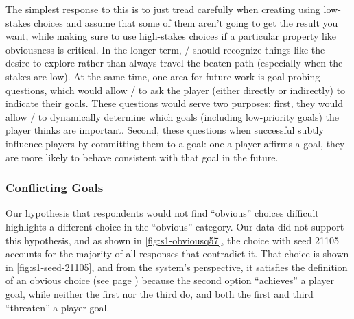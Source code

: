 The simplest response to this is to just tread carefully when creating using low-stakes choices and assume that some of them aren't going to get the result you want, while making sure to use high-stakes choices if a particular property like obviousness is critical.
%
In the longer term, \dunyazad/ should recognize things like the desire to explore rather than always travel the beaten path (especially when the stakes are low).
%
At the same time, one area for future work is goal-probing questions, which would allow \dunyazad/ to ask the player (either directly or indirectly) to indicate their goals.
%
These questions would serve two purposes: first, they would allow \dunyazad/ to dynamically determine which goals (including low-priority goals) the player thinks are important.
%
Second, these questions when successful subtly influence players by committing them to a goal: one a player affirms a goal, they are more likely to behave consistent with that goal in the future.


\subsubsection{Conflicting Goals}


Our hypothesis that respondents would not find ``obvious'' choices difficult highlights a different choice in the ``obvious'' category.
%
Our data did not support this hypothesis, and as shown in \cref{fig:s1-obviousq57}, the choice with seed 21105 accounts for the majority of all responses that contradict it.
%
That choice is shown in \cref{fig:s1-seed-21105}, and from the system's perspective, it satisfies the definition of an obvious choice (see page \pageref{page:choicetypes}) because the second option ``achieves'' a player goal, while neither the first nor the third do, and both the first and third ``threaten'' a player goal.


